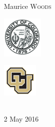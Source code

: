 \documentclass[12pt]{extarticle}
\newenvironment{sect}
  {\adjustwidth{-2.25em}{0pt}}
  {\endadjustwidth}
\newenvironment{subsubs}
  {\adjustwidth{2.25em}{0pt}}
  {\endadjustwidth}
\begin{document}
\begin{titlepage}
\begin{center}
\begin{minipage}{0.4\textwidth}
\begin{flushright}
						Maurice \textsc{Woods}
					\end{flushright}
				\end{minipage}
				\vfill
				\vspace{.75cm}
				\begin{minipage}{0.4\textwidth}
					\begin{flushleft} 
						\includegraphics[width=2cm]{Title/CUSeal.jpg}\\
					\end{flushleft}
				\end{minipage}
				\begin{minipage}{0.4\textwidth}
					\begin{flushright}
						\includegraphics[width=1.75cm]{Title/CULogo.jpg}\\
					\end{flushright}
				\end{minipage}\\
			{\small 2 May 2016}\\
		\end{center}
	\end{titlepage}
\newpage

\setcounter{tocdepth}{1}
\tableofcontents	
\newpage

%
%   
%        
\end{document}
